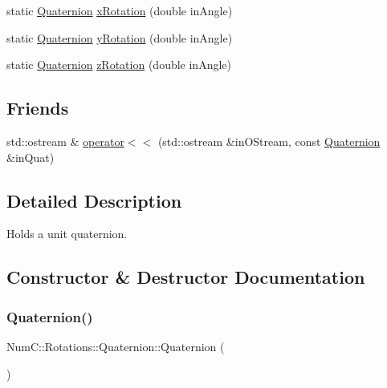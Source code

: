 \begin{DoxyCompactItemize}
\item 
static \mbox{\hyperlink{class_num_c_1_1_rotations_1_1_quaternion}{Quaternion}} \mbox{\hyperlink{class_num_c_1_1_rotations_1_1_quaternion_a8e068b817fc2d7018e7f6fd1ede977fa}{x\+Rotation}} (double in\+Angle)
\item 
static \mbox{\hyperlink{class_num_c_1_1_rotations_1_1_quaternion}{Quaternion}} \mbox{\hyperlink{class_num_c_1_1_rotations_1_1_quaternion_a750deeaf628f5ebf2f32187f998b448a}{y\+Rotation}} (double in\+Angle)
\item 
static \mbox{\hyperlink{class_num_c_1_1_rotations_1_1_quaternion}{Quaternion}} \mbox{\hyperlink{class_num_c_1_1_rotations_1_1_quaternion_a7f88c89f0597873a10fec577bb763873}{z\+Rotation}} (double in\+Angle)
\end{DoxyCompactItemize}
\subsection*{Friends}
\begin{DoxyCompactItemize}
\item 
std\+::ostream \& \mbox{\hyperlink{class_num_c_1_1_rotations_1_1_quaternion_a6d11f3a719f010cdd220642d2bb586e6}{operator$<$$<$}} (std\+::ostream \&in\+O\+Stream, const \mbox{\hyperlink{class_num_c_1_1_rotations_1_1_quaternion}{Quaternion}} \&in\+Quat)
\end{DoxyCompactItemize}


\subsection{Detailed Description}
Holds a unit quaternion. 

\subsection{Constructor \& Destructor Documentation}
\mbox{\label{class_num_c_1_1_rotations_1_1_quaternion_a652640bb697d5c3b79d33dfd8be23551}} 
\subsubsection{\texorpdfstring{Quaternion()}{Quaternion()}\hspace{0.1cm}{\footnotesize\ttfamily [1/3]}}
{\footnotesize\ttfamily Num\+C\+::\+Rotations\+::\+Quaternion\+::\+Quaternion (\begin{DoxyParamCaption}{ }\end{DoxyParamCaption})\hspace{0.3cm}{\ttfamily [inline]}}

